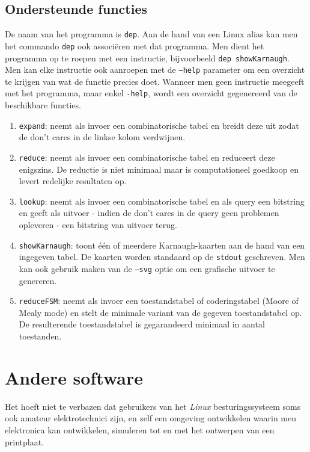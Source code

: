 \subsection{Ondersteunde functies}
De naam van het programma is \texttt{dep}. Aan de hand van een Linux alias kan men het commando \texttt{dep} ook associ\"eren met dat programma. Men dient het programma op te roepen met een instructie, bijvoorbeeld \texttt{dep showKarnaugh}. Men kan elke instructie ook aanroepen met de \texttt{--help} parameter om een overzicht te krijgen van wat de functie precies doet. Wanneer men geen instructie meegeeft met het programma, maar enkel \texttt{-help}, wordt een overzicht gegenereerd van de beschikbare functies.
\begin{enumerate}
 \item \texttt{expand}: neemt als invoer een combinatorische tabel en breidt deze uit zodat de don't cares in de linkse kolom verdwijnen.
 \item \texttt{reduce}: neemt als invoer een combinatorische tabel en reduceert deze enigszins. De reductie is niet minimaal maar is computationeel goedkoop en levert redelijke resultaten op.
 \item \texttt{lookup}: neemt als invoer een combinatorische tabel en als query een bitstring en geeft als uitvoer - indien de don't cares in de query geen problemen opleveren - een bitstring van uitvoer terug.
 \item \texttt{showKarnaugh}: toont \'e\'en of meerdere Karnaugh-kaarten aan de hand van een ingegeven tabel. De kaarten worden standaard op de \texttt{stdout} geschreven. Men kan ook gebruik maken van de \texttt{--svg} optie om een grafische uitvoer te genereren.
 \item \texttt{reduceFSM}: neemt als invoer een toestandstabel of coderingstabel (Moore of Mealy mode) en stelt de minimale variant van de gegeven toestandstabel op. De resulterende toestandstabel is gegarandeerd minimaal in aantal toestanden.
\end{enumerate}

\section{Andere software}
Het hoeft niet te verbazen dat gebruikers van het \emph{Linux} besturingssysteem soms ook amateur elektrotechnici zijn, en zelf een omgeving ontwikkelen waarin men elektronica kan ontwikkelen, simuleren tot en met het ontwerpen van een printplaat.